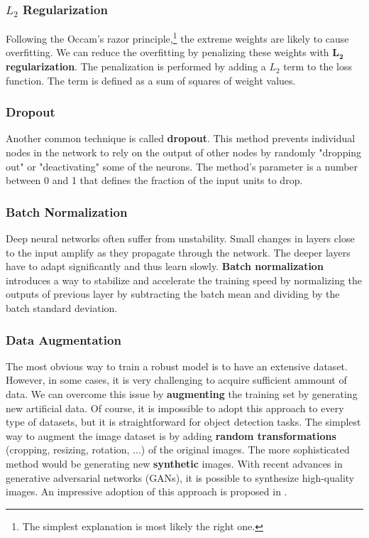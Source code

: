     \subsubsection{$L_2$ Regularization}
    Following the Occam's razor principle,\footnote{The simplest explanation is most
        likely the right one.} the extreme weights are likely to cause overfitting. We
    can reduce the overfitting by penalizing these weights with $\boldsymbol{L_2}$
    \textbf{regularization}. The penalization is performed by adding a $L_2$ term to
the loss function. The term is defined as a sum of squares of weight values.

\subsubsection{Dropout}
Another common technique is called \textbf{dropout}. This method prevents
individual nodes in the network to rely on the output of other nodes by randomly
"dropping out" or "deactivating" some of the neurons. The method's parameter is
a number between 0 and 1 that defines the fraction of the input units to drop.

\subsubsection{Batch Normalization}
Deep neural networks often suffer from unstability. Small changes in layers
close to the input amplify as they propagate through the network. The deeper
layers have to adapt significantly and thus learn slowly.
\textbf{Batch normalization} introduces a way to stabilize and accelerate the
training speed by normalizing the outputs of previous layer by subtracting the
batch mean and dividing by the batch standard deviation.

\subsubsection{Data Augmentation}
The most obvious way to train a robust model is to have an extensive dataset.
However, in some cases, it is very challenging to acquire sufficient ammount of
data. We can overcome this issue by
\textbf{augmenting} the training set by generating new artificial data. Of
course, it is impossible to adopt this approach to every type of datasets, but
it is straightforward for object detection tasks. The simplest way to augment
the image dataset is by adding \textbf{random transformations} (cropping,
resizing, rotation, ...) of the original images. The more sophisticated method
would be generating new \textbf{synthetic} images. With recent advances in
generative adversarial networks (GANs), it is possible to synthesize
high-quality images. An impressive adoption of this approach is proposed in
\cite{wei2019generative}.